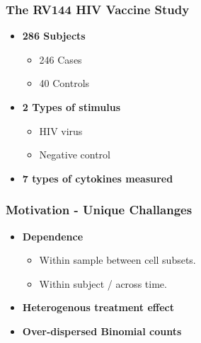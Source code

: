 \documentclass{beamer}
\theoremstyle{definition}
\begin{document}

\begin{frame}
\frametitle{The RV144 HIV Vaccine Study}
\begin{itemize}
\item \textbf{286 Subjects}
	\begin{itemize}
	\item 246 Cases
	\item 40 Controls
	\end{itemize}
\vspace{0.2 cm}
\item \textbf{2 Types of stimulus} 
	\begin{itemize}
	\item HIV virus
	\item Negative control
	\end{itemize}
\vspace{0.2 cm}
\item \textbf{7 types of cytokines measured} 
\end{itemize}
\end{frame}


\begin{frame}
\frametitle{Motivation - Unique Challanges}
\begin{itemize}
\item \textbf{Dependence}
	\begin{itemize}
	\item Within sample between cell subsets.
	\item Within subject / across time.  
	\end{itemize}
\vspace{0.76 cm}
\item \textbf{Heterogenous treatment effect}
\vspace{0.76 cm}
\item \textbf{Over-dispersed Binomial counts}
\end{itemize}
\end{frame}

\end{document}
